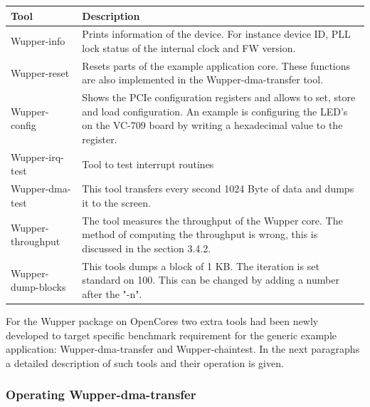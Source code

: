 \begin{center}
	\begin{tabular}{ | l || p{10cm} |}
		\hline
		Tool & Description                       \\ \hline

		Wupper-info
		&  Prints information of the device. For instance device ID, PLL lock status of the internal clock and FW version.
		\\ \hline
		
		Wupper-reset
		&  Resets parts of the example application core. These functions are also implemented in the Wupper-dma-transfer tool.
		\\ \hline
				
		
	    Wupper-config
		& Shows the PCIe configuration registers and allows to set, store and load configuration. An example is configuring the LED's on the VC-709 board by writing a hexadecimal value to the register.
                                     \\ \hline
  		Wupper-irq-test
  		&  Tool to test interrupt routines
  		\\ \hline
		
		Wupper-dma-test
		& This tool transfers every second 1024 Byte of data and dumps it to the screen.
	                                           \\ \hline
	
   		Wupper-throughput
   		&  The tool measures the throughput of the Wupper core. The method of computing the throughput is wrong, this is discussed in the section 3.4.2.
   		\\ \hline
	    		                                       
		
		Wupper-dump-blocks
		&  This tools dumps a block of 1 KB. The iteration is set standard on 100. This can be changed by adding a number after the "-n".
		                                          \\ \hline

	\end{tabular}
\end{center}

For the Wupper package on OpenCores two extra tools had been newly developed to target specific benchmark requirement for the generic example application: Wupper-dma-transfer and Wupper-chaintest. In the next paragraphs a detailed description of such tools and their operation is given.

\newpage

\subsubsection{Operating Wupper-dma-transfer}

